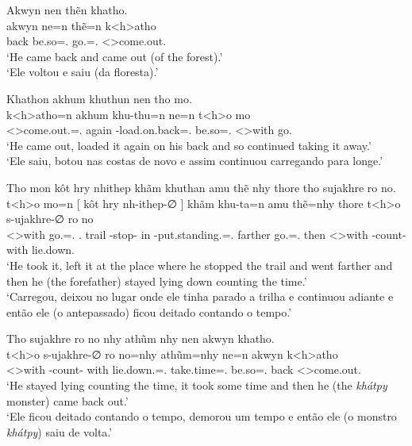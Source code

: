 \documentclass[output=paper,
modfonts,nonflat
]{langsci/langscibook}
\begin{document}
\ea  Akwyn nen thẽn khatho. \\[.3em]
\gll akwyn ne=n             thẽ=n             k<h>atho               \\
     back  be.so=\AAnd.\Ss{} go.\Sg=\AAnd.\Ss{} <\Third>come.out.\Sg{} \\
\glt `He came back and came out (of the forest).' \\
     `Ele voltou e saiu (da floresta).' \\
\z

\ea  Khathon akhum khuthun nen tho mo. \\[.3em]
\gll k<h>atho=n                      akhum khu-thu=n                      ne=n             t<h>o        mo       \\
     <\Third>come.out.\Sg=\AAnd.\Ss{} again \Third-load.on.back=\AAnd.\Ss{} be.so=\AAnd.\Ss{} <\Third>with go.\Pl{} \\
\glt `He came out, loaded it again on his back and so continued taking it away.' \\
     `Ele saiu, botou nas costas de novo e assim continuou carregando para longe.' \\
\z

\ea  Tho mon kôt hry nhithep khãm khuthan amu thẽ nhy thore tho sujakhre ro no. \\[.3em]
\gll t<h>o        mo=n              [  kôt           hry   nh-ithep-∅      ]  khãm khu-ta=n                           amu     thẽ=nhy             thore t<h>o        s-ujakhre-∅          ro   no             \\
     <\Third>with go.\Pl=\AAnd.\Ss{} {} \Third.\Erg{} trail \E-stop-\Nmlz{} {} in   \Third-put.standing.\Sg=\AAnd.\Ss{} farther go.\Sg{}=\AAnd.\Ds{} then  <\Third>with \Third-count-\Nmlz{} with lie.down.\Sg{} \\
\glt `He took it, left it at the place where he stopped the trail and went farther and then he (the forefather) stayed lying down counting the time.' \\
     `Carregou, deixou no lugar onde ele tinha parado a trilha e continuou adiante e então ele (o antepassado) ficou deitado contando o tempo.' \\
\z

\ea  Tho sujakhre ro no nhy athũm nhy nen akwyn khatho. \\[.3em]
\gll t<h>o        s-ujakhre-∅          ro   no=nhy                    athũm=nhy            ne=n             akwyn k<h>atho               \\
     <\Third>with \Third-count-\Nmlz{} with lie.down.\Sg{}=\AAnd.\Ds{} take.time=\AAnd.\Ds{} be.so=\AAnd.\Ss{} back  <\Third>come.out.\Sg{} \\
\glt `He stayed lying counting the time, it took some time and then he (the \textit{khátpy} monster) came back out.' \\
     `Ele ficou deitado contando o tempo, demorou um tempo e então ele (o monstro \textit{khátpy}) saiu de volta.' \\
\z
\end{document}
